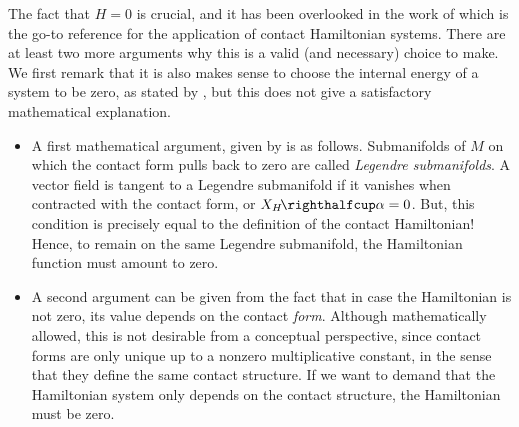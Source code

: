 The fact that $H = 0$ is crucial, and it has been overlooked in the work of \citet{Bravetti2017} which is the go-to reference for the application of contact Hamiltonian systems. There are at least two more arguments why this is a valid (and necessary) choice to make. We first remark that it is also makes sense to choose the internal energy of a system to be zero, as stated by \cite{Fermi1936}, but this does not give a satisfactory mathematical explanation.
\begin{itemize}
\item A first mathematical argument, given by \cite{Mrugala1991} is as follows. Submanifolds of $M$ on which the contact form pulls back to zero are called \emph{Legendre submanifolds}.
A vector field is tangent to a Legendre submanifold if it vanishes when contracted with the contact form, or $ \intpr{X_H}{\alpha} = 0$. But, this condition is precisely equal to the definition of the contact Hamiltonian! Hence, to remain on the same Legendre submanifold, the Hamiltonian function must amount to zero. 
\item A second argument can be given from the fact that in case the Hamiltonian is not zero, its value depends on the contact \emph{form}. Although mathematically allowed, this is not desirable from a conceptual perspective, since contact forms are only unique up to a nonzero multiplicative constant, in the sense that they define the same contact structure. If we want to demand that the Hamiltonian system only depends on the contact structure, the Hamiltonian must be zero.
\end{itemize}

